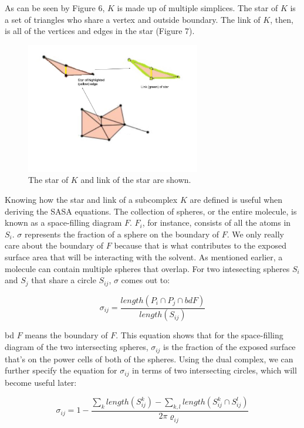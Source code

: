 \documentclass{article}
\begin{document}
As can be seen by Figure 6, $K$ is made up of multiple simplices. The star of $K$ is a set of triangles who share a vertex and outside boundary. The link of $K$, then, is all of the vertices and edges in the star (Figure 7).

\begin{figure}[h!]
\caption{The star of $K$ and link of the star are shown.\cite{Bryant}}
\centerline{\includegraphics[width=3in]{Figure5}}
\end{figure}

Knowing how the star and link of a subcomplex $K$ are defined is useful when deriving the SASA equations.
The collection of spheres, or the entire molecule, is known as a space-filling diagram $F$. $F_i$, for instance, consists of all the atoms in $S_i$. $\sigma$ represents the fraction of a sphere on the boundary of $F$. We only really care about the boundary of $F$ because that is what contributes to the exposed surface area that will be interacting with the solvent. As mentioned earlier, a molecule can contain multiple spheres that overlap. For two intesecting spheres $S_i$ and $S_j$ that share a circle $S_{ij}$, $\sigma$ comes out to:

\begin{equation}
\sigma_{ij} = \frac{length(P_i \cap P_j \cap bd F)}{length(S_{ij})}
\end{equation}

bd $F$ means the boundary of $F$. This equation shows that for the space-filling diagram of the two intersecting spheres, $\sigma_{ij}$ is the fraction of the exposed surface that's on the power cells of both of the spheres.
Using the dual complex, we can further specify the equation for $\sigma_{ij}$ in terms of two intersecting circles, which will become useful later:

\begin{equation}
\sigma_{ij} = 1 - \frac{\sum_{k}length(S^k_{ij})- \sum_{k,l}length(S^k_{ij} \cap S^l_{ij})}{2\pi\varrho_{ij}}
\end{equation}
\end{document}
